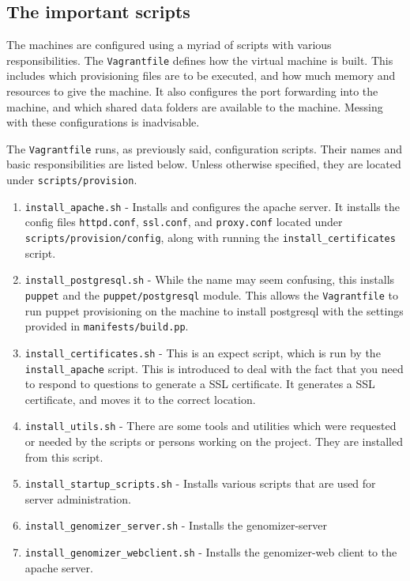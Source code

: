 \subsection{The important scripts}\label{the-important-scripts}

The machines are configured using a myriad of scripts with various
responsibilities. The \texttt{Vagrantfile} defines how the virtual
machine is built. This includes which provisioning files are to be
executed, and how much memory and resources to give the machine. It also
configures the port forwarding into the machine, and which shared data
folders are available to the machine. Messing with these configurations
is inadvisable.

The \texttt{Vagrantfile} runs, as previously said, configuration
scripts. Their names and basic responsibilities are listed below. Unless
otherwise specified, they are located under \texttt{scripts/provision}.

\begin{enumerate}
\itemsep1pt\parskip0pt
\item
  \texttt{install\_apache.sh} - Installs and configures the apache
  server. It installs the config files \texttt{httpd.conf},
  \texttt{ssl.conf}, and \texttt{proxy.conf} located under
  \texttt{scripts/provision/config}, along with running the
  \texttt{install\_certificates} script.
\item
  \texttt{install\_postgresql.sh} - While the name may seem confusing,
  this installs \texttt{puppet} and the \texttt{puppet/postgresql}
  module. This allows the \texttt{Vagrantfile} to run puppet
  provisioning on the machine to install postgresql with the settings
  provided in \texttt{manifests/build.pp}.
\item
  \texttt{install\_certificates.sh} - This is an expect script, which is
  run by the \texttt{install\_apache} script. This is introduced to deal
  with the fact that you need to respond to questions to generate a SSL
  certificate. It generates a SSL certificate, and moves it to the
  correct location.
\item
  \texttt{install\_utils.sh} - There are some tools and utilities which
  were requested or needed by the scripts or persons working on the
  project. They are installed from this script.
\item
  \texttt{install\_startup\_scripts.sh} - Installs various scripts that
  are used for server administration.
\item
  \texttt{install\_genomizer\_server.sh} - Installs the genomizer-server
\item
  \texttt{install\_genomizer\_webclient.sh} - Installs the genomizer-web
  client to the apache server.
\end{enumerate}

